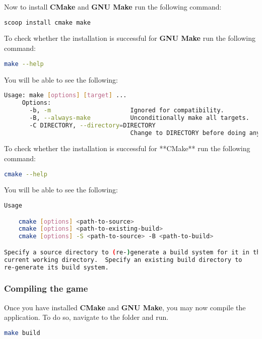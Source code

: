 Now to install \textbf{CMake} and \textbf{GNU Make} run the following command:

\begin{lstlisting}[language=bash]
     scoop install cmake make 
\end{lstlisting}
 
To check whether the installation is successful for \textbf{GNU Make} run the following command:

\begin{lstlisting}[language=bash]
    make --help
\end{lstlisting}

You will be able to see the following:
\begin{lstlisting}[language=bash]
     Usage: make [options] [target] ...
     Options:
       -b, -m                      Ignored for compatibility.
       -B, --always-make           Unconditionally make all targets.
       -C DIRECTORY, --directory=DIRECTORY
                                   Change to DIRECTORY before doing anything
\end{lstlisting}
    
To check whether the installation is successful for **CMake** run the following command:

\begin{lstlisting}[language=bash]
    cmake --help
\end{lstlisting}

You will be able to see the following:

\begin{lstlisting}[language=bash]
Usage

    cmake [options] <path-to-source>
    cmake [options] <path-to-existing-build>
    cmake [options] -S <path-to-source> -B <path-to-build>

Specify a source directory to (re-)generate a build system for it in the
current working directory.  Specify an existing build directory to
re-generate its build system.
\end{lstlisting}


\subsubsection{Compiling the game}

Once you have installed \textbf{CMake} and \textbf{GNU Make}, you may now
compile the application. To do so, navigate to the  folder and run.
 
\begin{lstlisting}[language=bash]
    make build
\end{lstlisting}

